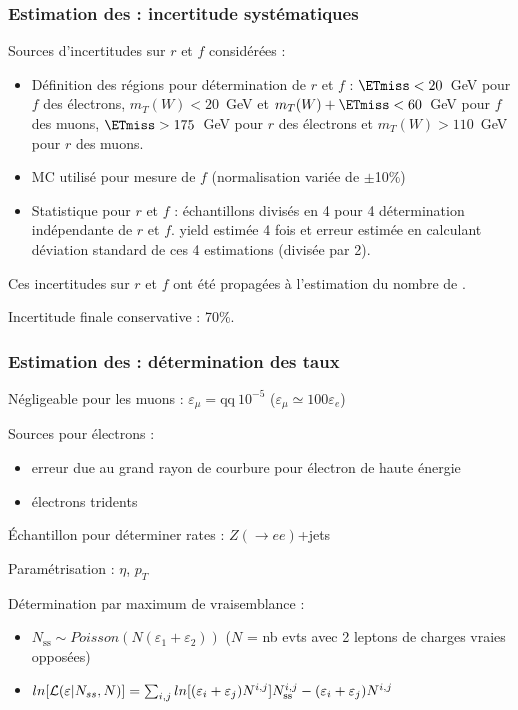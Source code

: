 \begin{frame}
\frametitle{Estimation des  : incertitude systématiques}

\begin{maliste}
\item Sources d'incertitudes sur $r$ et $f$ considérées :
\begin{itemize}
\item Définition des régions pour détermination de $r$ et $f$ : $\ETmiss<20$~GeV pour $f$ des électrons, $m_T(W)<20$~GeV et $m_T(W)+\ETmiss<60$~GeV pour $f$ des muons, $\ETmiss>175$~GeV pour $r$ des électrons et $m_T(W)>110$~GeV pour $r$ des muons.
\item MC utilisé pour mesure de $f$ (normalisation variée de $\pm$10\%)
\item Statistique pour $r$ et $f$ : échantillons divisés en 4 pour 4 détermination indépendante de $r$ et $f$.  yield estimée 4 fois et erreur estimée en calculant déviation standard de ces 4 estimations (divisée par 2).
\end{itemize}
\item Ces incertitudes sur $r$ et $f$ ont été propagées à l'estimation du nombre de .
\item Incertitude finale conservative : 70\%.
\end{maliste}
\end{frame}

\begin{frame}
\frametitle{Estimation des  : détermination des taux}

\begin{maliste}
\item Négligeable pour les muons : $\varepsilon_\mu=\text{qq}~10^{-5}$ ($\varepsilon_\mu\simeq 100 \varepsilon_e$)
\item Sources pour électrons : 
\begin{itemize}
\item erreur due au grand rayon de courbure pour électron de haute énergie 
\item électrons tridents
\end{itemize}
\item \'Echantillon pour déterminer rates : $Z(\rightarrow ee)$+jets
\item Paramétrisation : $\eta$, $p_T$
\item Détermination par maximum de vraisemblance : 
\begin{itemize}
\item $N_{\text{ss}}\sim Poisson\left(N\left(\varepsilon_1+\varepsilon_2\right)\right)$ ($N$ = nb evts avec 2 leptons de charges vraies opposées)
\item $ln[{\cal L}(\varepsilon | N_{ss},N)] = \sum_{i,j} ln[(\varepsilon_i + \varepsilon_j)N^{i,j}]N_{\text{ss}}^{i,j} - (\varepsilon_{i} + \varepsilon_{j})N^{i,j}$
\end{itemize}
\end{maliste}
\end{frame}


